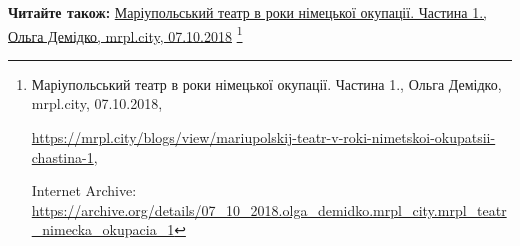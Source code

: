  
 
 
 
 

\textbf{Читайте також:} \href{https://archive.org/details/07_10_2018.olga_demidko.mrpl_city.mrpl_teatr_nimecka_okupacia_1}{%
Маріупольський театр в роки німецької окупації. Частина 1., Ольга Демідко, mrpl.city, 07.10.2018}%
\footnote{Маріупольський театр в роки німецької окупації. Частина 1., Ольга Демідко, mrpl.city, 07.10.2018, \par\url{https://mrpl.city/blogs/view/mariupolskij-teatr-v-roki-nimetskoi-okupatsii-chastina-1}, \par Internet Archive: \url{https://archive.org/details/07_10_2018.olga_demidko.mrpl_city.mrpl_teatr_nimecka_okupacia_1}}
